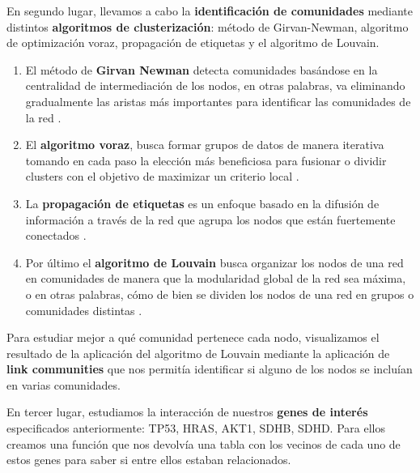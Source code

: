 \vspace{3pt}

En segundo lugar, llevamos a cabo la \textbf{identificación de comunidades} mediante distintos \textbf{algoritmos de clusterización}: método de Girvan-Newman, algoritmo de optimización voraz, propagación de etiquetas y el algoritmo de Louvain. 

\vspace{3pt}
\begin{enumerate}
\item El método de \textbf{Girvan Newman} detecta comunidades basándose en la centralidad de intermediación de los nodos, en otras palabras, va eliminando gradualmente las aristas más importantes para identificar las comunidades de la red \cite{Zahiri2023}.


\item El \textbf{algoritmo voraz}, busca formar grupos de datos de manera iterativa tomando en cada paso la elección más beneficiosa para fusionar o dividir clusters con el objetivo de maximizar un criterio local \cite{Curtis2003}. 


\item La \textbf{propagación de etiquetas} es un enfoque basado en la difusión de información a través de la red que agrupa los nodos que están fuertemente conectados \cite{Garza2019}.

\item Por último el \textbf{algoritmo de Louvain} busca organizar los nodos de una red en comunidades de manera que la modularidad global de la red sea máxima, o en otras palabras, cómo de bien se dividen los nodos de una red en grupos o comunidades distintas \cite{Zhang2021}.

\end{enumerate}

\vspace{3pt}

Para estudiar mejor a qué comunidad pertenece cada nodo, visualizamos el resultado de la aplicación del algoritmo de Louvain mediante la aplicación de \textbf{link communities} que nos permitía identificar si alguno de los nodos se incluían en varias comunidades. 

\vspace{3pt}

En tercer lugar, estudiamos la interacción de nuestros \textbf{genes de interés} especificados anteriormente: TP53, HRAS, AKT1, SDHB, SDHD. Para ellos creamos una función que nos devolvía una tabla con los vecinos de cada uno de estos genes para saber si entre ellos estaban relacionados.

